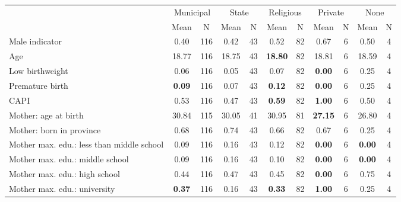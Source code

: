 \begin{tabular}{l c c c c c c c c c c}
\toprule
& \multicolumn{2}{c}{Municipal} & \multicolumn{2}{c}{State} & \multicolumn{2}{c}{Religious} & \multicolumn{2}{c}{Private} & \multicolumn{2}{c}{None} \\
& \scriptsize Mean & \scriptsize N & \scriptsize Mean & \scriptsize N & \scriptsize Mean & \scriptsize N & \scriptsize Mean & \scriptsize N & \scriptsize Mean & \scriptsize N \\
\midrule
Male indicator &      0.40 &       116 &      0.42 &        43 &      0.52 &        82 &      0.67 &         6 &      0.50 &         4 \\
Age &     18.77 &       116 &     18.75 &        43 & \textbf{    18.80} &        82 &     18.81 &         6 &     18.59 &         4 \\
Low birthweight &      0.06 &       116 &      0.05 &        43 &      0.07 &        82 & \textbf{     0.00} &         6 &      0.25 &         4 \\
Premature birth & \textbf{     0.09} &       116 &      0.07 &        43 & \textbf{     0.12} &        82 & \textbf{     0.00} &         6 &      0.25 &         4 \\
CAPI &      0.53 &       116 &      0.47 &        43 & \textbf{     0.59} &        82 & \textbf{     1.00} &         6 &      0.50 &         4 \\
Mother: age at birth &     30.84 &       115 &     30.05 &        41 &     30.95 &        81 & \textbf{    27.15} &         6 &     26.80 &         4 \\
Mother: born in province &      0.68 &       116 &      0.74 &        43 &      0.66 &        82 &      0.67 &         6 &      0.25 &         4 \\
Mother max. edu.: less than middle school &      0.09 &       116 &      0.16 &        43 &      0.12 &        82 & \textbf{     0.00} &         6 & \textbf{     0.00} &         4 \\
Mother max. edu.: middle school &      0.09 &       116 &      0.16 &        43 &      0.10 &        82 & \textbf{     0.00} &         6 & \textbf{     0.00} &         4 \\
Mother max. edu.: high school &      0.44 &       116 &      0.47 &        43 &      0.45 &        82 & \textbf{     0.00} &         6 &      0.75 &         4 \\
Mother max. edu.: university & \textbf{     0.37} &       116 &      0.16 &        43 & \textbf{     0.33} &        82 & \textbf{     1.00} &         6 &      0.25 &         4 \\

\end{tabular}

